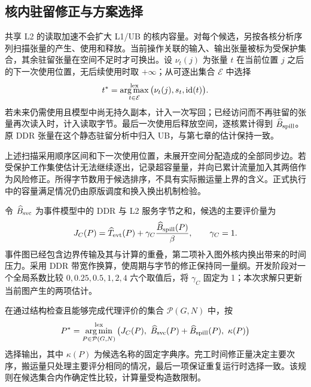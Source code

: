 \subsection{核内驻留修正与方案选择}
共享 L2 的读取加速不会扩大 L1/UB 的核内容量。对每个候选，另按各核分析序列扫描张量的产生、使用和释放。当前操作关联的输入、输出张量被标为受保护集合，其余驻留张量在空间不足时才可换出。设 $\nu_t(j)$ 为张量 $t$ 在当前位置 $j$ 之后的下一次使用位置，无后续使用时取 $+\infty$；从可逐出集合 $\mathcal E$ 中选择
\begin{equation}
t^*=\operatorname*{arg\,max}_{t\in\mathcal E}^{\rm lex}
\big(\nu_t(j),s_t,\operatorname{id}(t)\big).
\label{eq:q3-victim}
\end{equation}
若未来仍需使用且模型中尚无持久副本，计入一次写回；已经访问而不再驻留的张量再次读入时，计入读取字节。最后一次使用后释放空间，逐核累计得到 $\widehat B_{\rm spill}$。原 DDR 张量在这个静态驻留分析中归入 UB，与第七章的估计保持一致。

上述扫描采用顺序区间和下一次使用位置，未展开空间分配造成的全部同步边。若受保护工作集使估计无法继续逐出，记录超容量量，并向已累计流量加入其两倍作为风险修正。所得字节数用于候选排序，不具有实际搬运量上界的含义。正式执行中的容量满足情况仍由原版调度和换入换出机制检验。

令 $\widehat B_{\rm svc}$ 为事件模型中的 DDR 与 L2 服务字节之和，候选的主要评价量为
\begin{equation}
J_C(P)=\widehat T_{\rm evt}(P)+\gamma_C\frac{\widehat B_{\rm spill}(P)}{\beta},
\qquad \gamma_C=1.
\label{eq:q3-score}
\end{equation}
事件图已经包含边界传输及其与计算的重叠，第二项补入图外核内换出带来的时间压力。采用 DDR 带宽作换算，使周期与字节的修正保持同一量纲。开发阶段对一个全局系数比较 $0,0.25,0.5,1,2,4$ 六个取值后，将 $\gamma_C$ 固定为 1；本次求解只更新当前图产生的两项估计。

在通过结构检查且能够完成代理评价的集合 $\mathcal P(G,N)$ 中，按
\begin{equation}
P^*=\operatorname*{arg\,min}_{P\in\mathcal P(G,N)}^{\rm lex}
\big(J_C(P),\ \widehat B_{\rm svc}(P)+\widehat B_{\rm spill}(P),\ \kappa(P)\big)
\label{eq:q3-selection}
\end{equation}
选择输出，其中 $\kappa(P)$ 为候选名称的固定字典序。完工时间修正量决定主要次序，搬运量只处理主要评分相同的情况，最后一项保证重复运行时选择一致。该规则在候选集合内作确定性比较，计算量受构造数限制。


